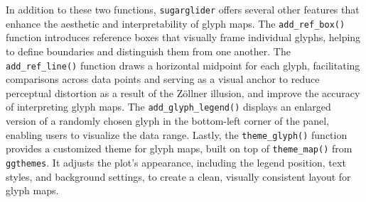In addition to these two functions, \texttt{sugarglider} offers several other features that enhance the aesthetic and interpretability of glyph maps. The \texttt{add\_ref\_box()} function introduces reference boxes that visually frame individual glyphs, helping to define boundaries and distinguish them from one another. The \texttt{add\_ref\_line()} function draws a horizontal midpoint for each glyph, facilitating comparisons across data points and serving as a visual anchor to reduce perceptual distortion as a result of the Zöllner illusion, and improve the accuracy of interpreting glyph maps. The \texttt{add\_glyph\_legend()} displays an enlarged version of a randomly chosen glyph in the bottom-left corner of the panel, enabling users to visualize the data range. Lastly, the \texttt{theme\_glyph()} function provides a customized theme for glyph maps, built on top of \texttt{theme\_map()} from \texttt{ggthemes}. It adjusts the plot's appearance, including the legend position, text styles, and background settings, to create a clean, visually consistent layout for glyph maps.

